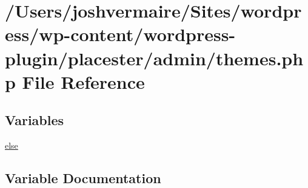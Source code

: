 \hypertarget{themes_8php}{
\section{/Users/joshvermaire/Sites/wordpress/wp-\/content/wordpress-\/plugin/placester/admin/themes.php File Reference}
\label{d6/d63/themes_8php}
}
\subsection*{Variables}
\begin{DoxyCompactItemize}
\item 
\hyperlink{themes_8php_a0544c3fe466e421738dae463968b70ba}{else}
\end{DoxyCompactItemize}


\subsection{Variable Documentation}
\hypertarget{themes_8php_a0544c3fe466e421738dae463968b70ba}{
\subsubsection[{else}]{}}
\label{d6/d63/themes_8php_a0544c3fe466e421738dae463968b70ba}
